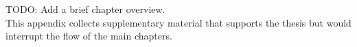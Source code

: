   {TODO: Add a brief chapter overview. \\
  This appendix collects supplementary material that supports the thesis but would interrupt the flow of the main chapters.}

%
%
%
